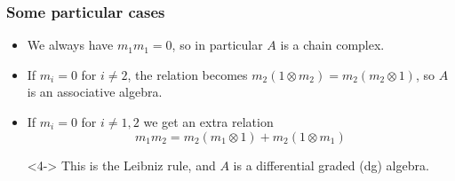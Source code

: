 \documentclass{beamer}
\theoremstyle{definition}
\begin{document}
\begin{frame}
\frametitle{Some particular cases}
\begin{itemize}
\item<1-> We always have $m_1m_1=0$, so in particular $A$ is a chain complex.%
\item<2-> If $m_i=0$ for $i\neq 2$, the relation becomes $m_2(1\otimes m_2)=m_2(m_2\otimes 1)$, so $A$ is an associative algebra.
\item<3-> If $m_i=0$ for $i\neq 1,2$ we get an extra relation $$m_1m_2=m_2(m_1\otimes 1)+m_2(1\otimes m_1)$$ %
\item[]<4-> This is the Leibniz rule, and $A$ is a differential graded (dg) algebra.
\end{itemize}
\end{frame}
\end{document}
